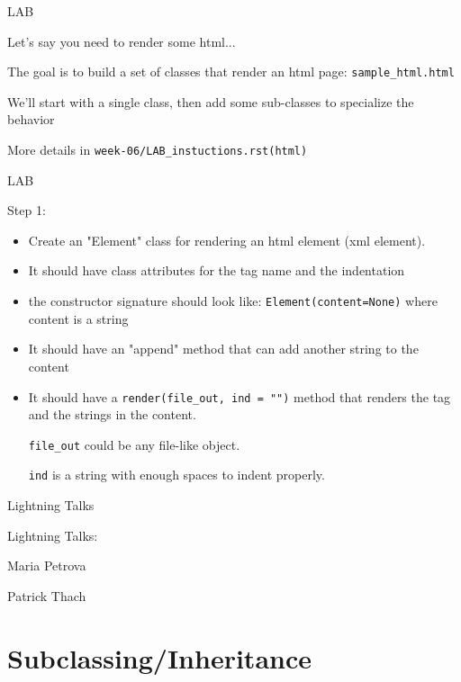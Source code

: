 \documentclass{beamer}
\begin{document}
\begin{frame}[fragile]{LAB}

\vfill
{\Large Let's say you need to render some html...}

\vfill
{\Large The goal is to build a set of classes that render an html page:
\verb|sample_html.html|
}

\vfill
{\Large We'll start with a single class, then add some sub-classes to specialize the behavior}

\vfill
More details in \verb|week-06/LAB_instuctions.rst(html)|
\end{frame}

\begin{frame}[fragile]{LAB}

\vfill
{\Large Step 1:}

\begin{itemize}
  \item Create an "Element" class for rendering an html element (xml element). 
  \item It should have class attributes for the tag name  and the
  indentation
  \item the constructor signature should look like:
    \verb|Element(content=None)| where content is a string
  \item It should have an "append" method that can add another string to the content
  \item It should have a \verb|render(file_out, ind = "")| method that renders the tag and the strings in the content.

     \verb|file_out| could be any file-like object.

     \verb|ind| is a string with enough spaces to indent properly.
\end{itemize}

\end{frame}

\begin{frame}{Lightning Talks}

{\centering

\vfill
{\LARGE Lightning Talks: }

\vfill
{\Large Maria Petrova}

\vfill
{\Large Patrick Thach}


\vfill
}
\end{frame}

\section{Subclassing/Inheritance}
\end{document}
